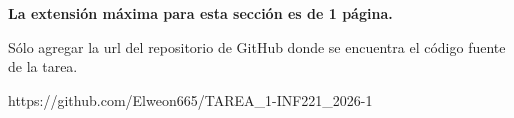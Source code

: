 \begin{mdframed}
    \textbf{La extensión máxima para esta sección es de 1 página.}
\end{mdframed}

Sólo agregar la url del repositorio de GitHub donde se encuentra el código fuente de la tarea. 

https://github.com/Elweon665/TAREA_1-INF221_2026-1

